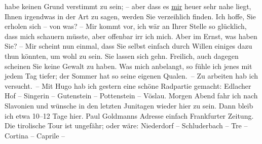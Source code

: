 \begin{ledgroupsized}[t]{13cm}
               habe keinen Grund verstimmt zu sein; – aber dass es \uline{mir} heuer sehr nahe liegt, Ihnen irgendwas in der Art zu sagen, werden Sie
               verzeihlich finden. Ich hoffe, Sie erholen sich – von was? – Mir kommt vor, ich wär
               an Ihrer Stelle so glücklich, dass mich schauern müsste, aber offenbar irr ich mich.
               Aber im Ernst, was haben Sie? – Mir scheint nun einmal, dass Sie selbst einfach durch
               Willen einiges dazu thun könnten, um wohl zu sein. Sie lassen sich gehn. Freilich,
               auch dagegen scheinen Sie keine Gewalt zu haben.\pend
           \pstart
           Was mich anbelangt, so fühle ich jenes \label{K_L00928_1v}\label{K_L00928_1h} mit {\pb}jedem Tag tiefer; der Sommer hat so seine
               eigenen Qualen. – Zu arbeiten hab ich versucht. – Mit Hugo hab ich gestern eine schöne Radpartie gemacht: Edlacher Hof – Singerin – Gutenstein – Pottenstein – Vöslau.\pend
           \pstart
           Morgen Abend fahr ich nach Slavonien und wünsche
               in den letzten Junitagen wieder hier zu sein. Dann bleib ich etwa 10–12
               Tage hier.\pend
           \pstart
           Paul Goldmanns Adresse einfach Frankfurter Zeitung.\pend
           \pstart
           Die tirolische Tour ist ungefähr; oder wäre:
                  Niederdorf – Schluderbach – Tre \label{T_L00928_1v}\label{T_L00928_1h} – Cortina – Caprile – \label{T_L00928_2v}
\end{ledgroupsized}
